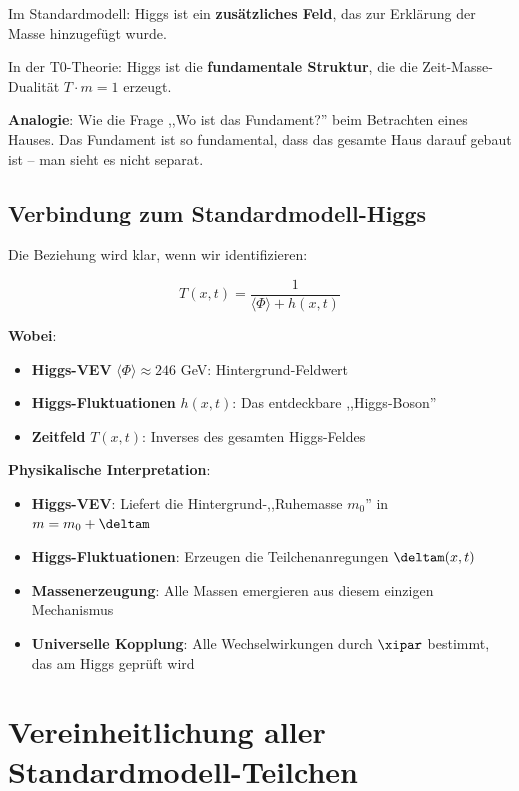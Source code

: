 	\begin{tcolorbox}[colback=purple!5!white,colframe=purple!75!black,title=Higgs-Integration in der T0-Theorie]
		Im Standardmodell: Higgs ist ein \textbf{zusätzliches Feld}, das zur Erklärung der Masse hinzugefügt wurde.
		
		In der T0-Theorie: Higgs ist die \textbf{fundamentale Struktur}, die die Zeit-Masse-Dualität $T \cdot m = 1$ erzeugt.
		
		\textbf{Analogie}: Wie die Frage ,,Wo ist das Fundament?'' beim Betrachten eines Hauses. Das Fundament ist so fundamental, dass das gesamte Haus darauf gebaut ist -- man sieht es nicht separat.
	\end{tcolorbox}
	
	\subsection{Verbindung zum Standardmodell-Higgs}
	
	Die Beziehung wird klar, wenn wir identifizieren:
	
	\begin{equation}
		T(x,t) = \frac{1}{\langle\Phi\rangle + h(x,t)}
	\end{equation}
	
	\textbf{Wobei}:
	\begin{itemize}
		\item \textbf{Higgs-VEV} $\langle\Phi\rangle \approx 246$ GeV: Hintergrund-Feldwert
		\item \textbf{Higgs-Fluktuationen} $h(x,t)$: Das entdeckbare ,,Higgs-Boson''
		\item \textbf{Zeitfeld} $T(x,t)$: Inverses des gesamten Higgs-Feldes
	\end{itemize}
	
	\textbf{Physikalische Interpretation}:
	\begin{itemize}
		\item \textbf{Higgs-VEV}: Liefert die Hintergrund-,,Ruhemasse $m_0$'' in $m = m_0 + \deltam$
		\item \textbf{Higgs-Fluktuationen}: Erzeugen die Teilchenanregungen $\deltam(x,t)$
		\item \textbf{Massenerzeugung}: Alle Massen emergieren aus diesem einzigen Mechanismus
		\item \textbf{Universelle Kopplung}: Alle Wechselwirkungen durch $\xipar$ bestimmt, das am Higgs geprüft wird
	\end{itemize}
	
	\section{Vereinheitlichung aller Standardmodell-Teilchen}
	
